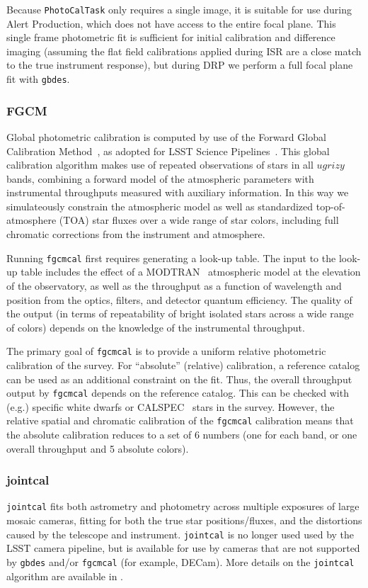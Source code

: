 Because \texttt{PhotoCalTask} only requires a single image, it is suitable for use during Alert Production, which does not have access to the entire focal plane.
This single frame photometric fit is sufficient for initial calibration and difference imaging (assuming the flat field calibrations applied during ISR are a close match to the true instrument response), but during DRP we perform a full focal plane fit with \texttt{gbdes}.

\subsubsection{FGCM}
\label{sec:fgcmcal}

Global photometric calibration is computed by use of the Forward Global Calibration Method~\citep[FGCM][]{2018AJ....155...41B}, as adopted for LSST Science Pipelines~\citep{SITCOMTN-086}.
This global calibration algorithm makes use of repeated observations of stars in all $ugrizy$ bands, combining a forward model of the atmospheric parameters with instrumental throughputs measured with auxiliary information.
In this way we simulateously constrain the atmospheric model as well as standardized top-of-atmosphere (TOA) star fluxes over a wide range of star colors, including full chromatic corrections from the instrument and atmosphere.

Running \texttt{fgcmcal} first requires generating a look-up table.
The input to the look-up table includes the effect of a MODTRAN~\citep{10.1117/12.366388} atmospheric model at the elevation of the observatory, as well as the throughput as a function of wavelength and position from the optics, filters, and detector quantum efficiency.
The quality of the output (in terms of repeatability of bright isolated stars across a wide range of colors) depends on the knowledge of the instrumental throughput.

The primary goal of \texttt{fgcmcal} is to provide a uniform relative photometric calibration of the survey.
For ``absolute'' (relative) calibration, a reference catalog can be used as an additional constraint on the fit.
Thus, the overall throughput output by \texttt{fgcmcal} depends on the reference catalog.
This can be checked with (e.g.) specific white dwarfs or CALSPEC~\citep{2007ASPC..364..315B} stars in the survey.
However, the relative spatial and chromatic calibration of the \texttt{fgcmcal} calibration means that the absolute calibration reduces to a set of 6 numbers (one for each band, or one overall throughput and 5 absolute colors).

\subsubsection{jointcal}

\texttt{jointcal} fits both astrometry and photometry across multiple exposures of large mosaic cameras, fitting for both the true star positions/fluxes, and the distortions caused by the telescope and instrument.
\texttt{jointcal} is no longer used used by the LSST camera pipeline, but is available for use by cameras that are not supported by \texttt{gbdes} and/or \texttt{fgcmcal} (for example, DECam).
More details on the \texttt{jointcal} algorithm are available in \citep{DMTN-036}.
